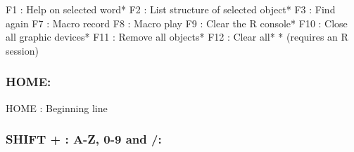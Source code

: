 \vspace{-0.5cm}
\begin{Rtables}[caption={[Function + keyboard shortcuts]
    Function + keyboard shortcuts},
  label=shortcut:funplus]
  F1      : Help on selected word*
  F2      : List structure of selected object*
  F3      : Find again
  F7      : Macro record
  F8      : Macro play
  F9      : Clear the R console*
  F10     : Close all graphic devices*
  F11     : Remove all objects*
  F12     : Clear all*
  * (requires an R session)
\end{Rtables}


\subsubsection{HOME:}

\vspace{-0.5cm}
\begin{Rtables}[caption={[HOME keyboard shortcut]
    HOME keyboard shortcut},
  label=shortcut:home]
  HOME    : Beginning line
\end{Rtables}


\newpage
\subsubsection{SHIFT + : A-Z, 0-9 and /:}

